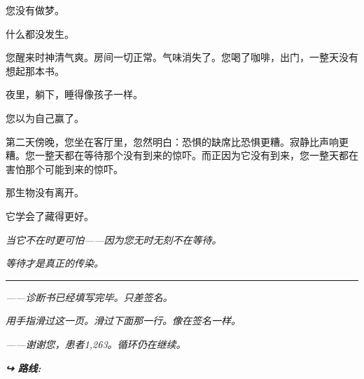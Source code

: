 \noindent 您没有做梦。

\noindent 什么都没发生。

\noindent 您醒来时神清气爽。房间一切正常。气味消失了。您喝了咖啡，出门，一整天没有想起那本书。

\noindent 夜里，躺下，睡得像孩子一样。

\noindent 您以为自己赢了。

\noindent 第二天傍晚，您坐在客厅里，忽然明白：恐惧的缺席比恐惧更糟。寂静比声响更糟。您一整天都在等待那个没有到来的惊吓。而正因为它没有到来，您一整天都在害怕那个可能到来的惊吓。

\noindent 那生物没有离开。

\noindent 它学会了藏得更好。

\noindent \textit{当它不在时更可怕——因为您无时无刻不在等待。}

\noindent \textit{等待才是真正的传染。}

\vspace{0.5em}\noindent\rule{\textwidth}{0.5pt}\vspace{0.5em}

\noindent \textit{——诊断书已经填写完毕。只差签名。}

\noindent \textit{用手指滑过这一页。滑过下面那一行。像在签名一样。}

\noindent \textit{——谢谢您，患者1,263。循环仍在继续。}

\vspace{0.5em}
\noindent\textit{\textbf{↪ 路线:}  \rotasep {}}
